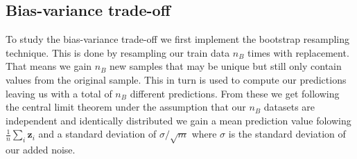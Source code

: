\documentclass[12pt]{article}
\begin{document}
\subsection{Bias-variance trade-off}
To study the bias-variance trade-off we first implement the bootstrap resampling technique. This is done by resampling our train data $n_B$ times with replacement. That means we gain $n_B$ new samples that may be unique but still only contain values from the original sample. This in turn is used to compute our predictions leaving us with a total of $n_B$ different predictions. From these we get following the central limit theorem under the assumption that our $n_B$ datasets are independent and identically distributed we gain a mean prediction value folowing $\frac{1}{n}\sum_i \boldsymbol{z}_i$ and a standard deviation of $\sigma/\sqrt{m}$ where $\sigma$ is the standard deviation of our added noise.
\end{document}
